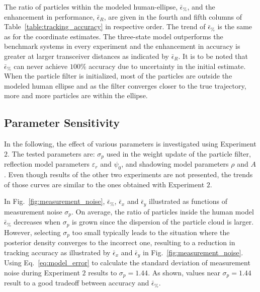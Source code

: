 \documentclass[journal, 10pt, twocolumn, balance]{IEEEtran}
\begin{document}
The ratio of particles within the modeled human-ellipse, $\bar{\epsilon}_\%$, and the enhancement in performance, $\bar{\epsilon}_R$, are given in the fourth and fifth columns of Table~\ref{table:tracking_accuracy} in respective order. The trend of $\bar{\epsilon}_\%$ is the same as for the coordinate estimates. The three-state model outperforms the benchmark systems in every experiment and the enhancement in accuracy is greater at larger transceiver distances as indicated by $\bar{\epsilon}_R$. It is to be noted that $\bar{\epsilon}_\%$ can never achieve $100 \%$ accuracy due to uncertainty in the initial estimate. When the particle filter is initialized, most of the particles are outside the modeled human ellipse and as the filter converges closer to the true trajectory, more and more particles are within the ellipse. 


\subsection{Parameter Sensitivity}\label{sec:parameter_sensitivity}

In the following, the effect of various parameters is investigated using Experiment $2$. The tested parameters are: $\sigma_p$ used in the weight update of the particle filter, reflection model parameters $\varepsilon_r$ and $\psi_0$, and shadowing model parameters $\rho$ and $A$. Even though results of the other two experiments are not presented, the trends of those curves are similar to the ones obtained with Experiment $2$.

In Fig.~\ref{fig:measurement_noise}, $\bar{\epsilon}_\%$, $\bar{\epsilon}_x$ and $\bar{\epsilon}_y$ illustrated as functions of measurement noise $\sigma_p$. On average, the ratio of particles inside the human model $\bar{\epsilon}_\%$ decreases when $\sigma_p$ is grown since the dispersion of the particle cloud is larger. However, selecting $\sigma_p$ too small typically leads to the situation where the posterior density converges to the incorrect one, resulting to a reduction in tracking accuracy as illustrated by $\bar{\epsilon}_x$ and $\bar{\epsilon}_y$ in Fig.~\ref{fig:measurement_noise}. Using Eq.~\eqref{eq:model_error} to calculate the standard deviation of measurement noise during Experiment $2$ results to $\sigma_p=1.44$. As shown, values near $\sigma_p=1.44$ result to a good tradeoff between accuracy and $\bar{\epsilon}_\%$.
\end{document}
